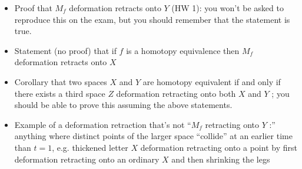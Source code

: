 \documentclass[12pt]{article}
\begin{document}
\begin{itemize}
\vspace*{30mm}
\item Proof that $M_f$ deformation retracts onto $Y$ (HW 1): you won't be asked to reproduce
    this on the exam, but you should remember that the statement is true.
    

\vspace*{30mm}
\item Statement (no proof) that if $f$ is a homotopy equivalence then $M_f$ deformation
    retracts onto $X$
    

\vspace*{30mm}
\item Corollary that two spaces $X$ and $Y$ are homotopy equivalent if and only if there exists
    a third space $Z$ deformation retracting onto both $X$ and $Y$ ; you should be able to
    prove this assuming the above statements.
    

\vspace*{30mm}
\item Example of a deformation retraction that's not “$M_f$ retracting onto $Y$ :” anything
    where distinct points of the larger space “collide” at an earlier time than $t = 1$, e.g.
    thickened letter $X$ deformation retracting onto a point by first deformation retracting
    onto an ordinary $X$ and then shrinking the legs


\vspace*{30mm}
\end{itemize}
\end{document}

